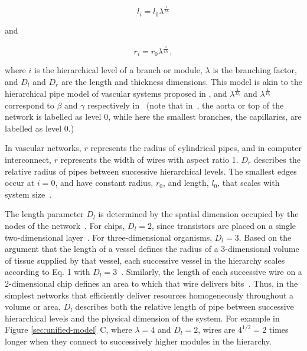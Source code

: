 \documentclass[12pt]{article}
\begin{document}
\begin{equation}
l_i = l_0 \lambda^{\frac{i}{D_l}}
\end{equation}

\noindent and

\begin{equation}
  r_i = r_0 \lambda^{\frac{i}{D_r}},
\label{eq:rscaling}
\end{equation}

\noindent where $i$ is the hierarchical level of a branch or module, $\lambda$
is the branching factor, and $D_l$ and $D_r$ are the length and thickness
dimensions. This model is akin to the hierarchical pipe model of vascular
systems proposed in \cite{west97}, and $\lambda^{\frac{1}{D_r}}$ and
$\lambda^{\frac{1}{D_l}}$ correspond to  $\beta$ and $\gamma$
respectively in~\cite{west97} (note that in~\cite{west97}, the aorta or top of the network is
labelled as level 0, while here the smallest branches, the capillaries, are
labelled as level 0.)

In vascular networks, $r$ represents the radius of cylindrical pipes, and in
computer interconnect, $r$ represents the width of wires with aspect ratio 1.
$D_r$ describes the relative radius of pipes between successive hierarchical
levels.  The smallest edges occur at $i = 0$, and have constant radius, $r_0$,
and length, $l_0$, that scales with system size~\cite{banavar10}. 

The length parameter $D_l$ is determined by the spatial dimension occupied by the
nodes of the network~\cite{mandelbrot83}.  For chips, $D_l = 2$, since
transistors are placed on a single two-dimensional layer~\cite{donath81}. For
three-dimensional organisms,  $D_l = 3$. Based on the argument that the length of a vessel defines the radius of a 3-dimensional volume of tissue supplied by that vessel, each successive vessel in the hierarchy scales according to Eq. 1 with $D_l = 3$~\cite{west97, banavar10}. Similarly, the length of each successive wire on a 2-dimensional chip defines an area to which that wire delivers bits~\cite{moses08}. Thus, in the simplest networks that efficiently deliver resources homogeneously throughout a volume or area, $D_l$ describes both the relative length of pipe between successive hierarchical levels and the physical
dimension of the system. For example in Figure \ref{sec:unified-model} C, where $\lambda = 4$ and $D_l = 2$, wires are $4^{1/2} = 2$ times longer when they connect to successively higher modules in the hierarchy.
\end{document}
